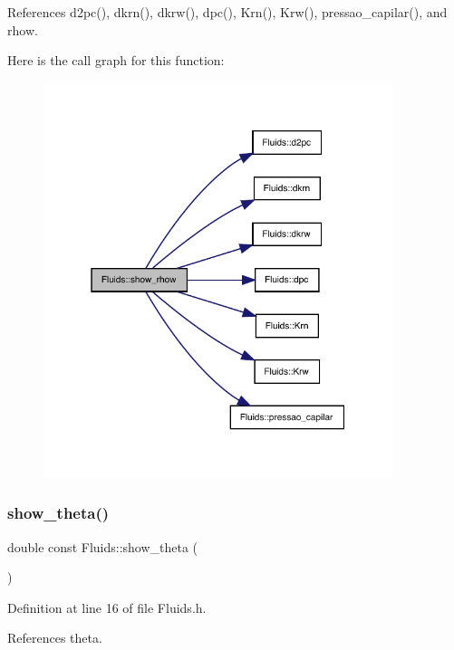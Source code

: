 References d2pc(), dkrn(), dkrw(), dpc(), Krn(), Krw(), pressao\+\_\+capilar(), and rhow.

Here is the call graph for this function\+:
\nopagebreak
\begin{figure}[H]
\begin{center}
\leavevmode
\includegraphics[width=289pt]{classFluids_abc729002dd8045a86a24727d1fa69a12_cgraph}
\end{center}
\end{figure}
\mbox{\label{classFluids_ad61d110a5ed2e811965c2f6c623fc249}} 
\subsubsection{\texorpdfstring{show\+\_\+theta()}{show\_theta()}}
{\footnotesize\ttfamily double const Fluids\+::show\+\_\+theta (\begin{DoxyParamCaption}{ }\end{DoxyParamCaption})\hspace{0.3cm}{\ttfamily [inline]}}



Definition at line 16 of file Fluids.\+h.



References theta.



